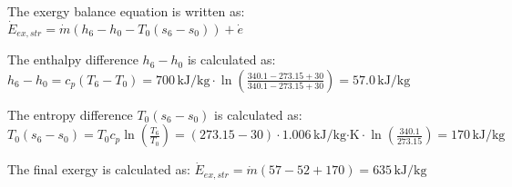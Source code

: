 The exergy balance equation is written as:  
\( \dot{E}_{ex,str} = \dot{m} (h_6 - h_0 - T_0 (s_6 - s_0)) + \dot{e} \)

The enthalpy difference \( h_6 - h_0 \) is calculated as:  
\( h_6 - h_0 = c_p (T_6 - T_0) = 700 \, \text{kJ/kg} \cdot \ln \left(\frac{340.1 - 273.15 + 30}{340.1 - 273.15 + 30}\right) = 57.0 \, \text{kJ/kg} \)

The entropy difference \( T_0 (s_6 - s_0) \) is calculated as:  
\( T_0 (s_6 - s_0) = T_0 c_p \ln \left(\frac{T_6}{T_0}\right) = (273.15 - 30) \cdot 1.006 \, \text{kJ/kg·K} \cdot \ln \left(\frac{340.1}{273.15}\right) = 170 \, \text{kJ/kg} \)

The final exergy is calculated as:  
\( \dot{E}_{ex,str} = \dot{m} (57 - 52 + 170) = 635 \, \text{kJ/kg} \)